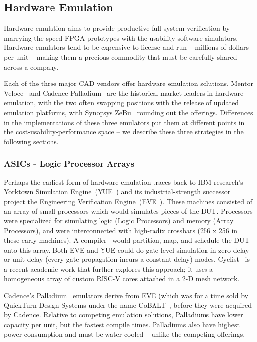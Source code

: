 \subsection{Hardware Emulation}

Hardware emulation aims to provide productive full-system verification by
marrying the speed FPGA prototypes with the usability software simulators.
Hardware emulators tend to be expensive to license and run -- millions of
dollars per unit -- making them a precious commodity that must be carefully
shared across a company.

Each of the three major CAD vendors offer hardware emulation solutions.
Mentor Veloce~\cite{Veloce} and Cadence Palladium~\cite{Palladium} are the historical market leaders in
hardware emulation, with the two often swapping positions with the release of updated
emulation platforms, with Synopsys ZeBu~\cite{ZeBu} rounding out the offerings.
Differences in the implementations of these three emulators put them at
different points in the cost-usability-performance space -- we describe these three strategies in the following sections.

\subsubsection{ASICs - Logic Processor Arrays}

Perhaps the earliest form of hardware emulation traces back to IBM research's
Yorktown Simulation Engine~(YUE~\cite{YSEHardware}) and its industrial-strength successor project
the Engineering Verification Engine~(EVE~\cite{EngineeringVerificationEngine}). These machines consisted of an array
of small processors which would simulates pieces of the DUT. Processors were
specialized for simulating logic (Logic Processors) and memory (Array
Processors), and were interconnected with high-radix crossbars (256 x 256 in
these early machines). A compiler~\cite{YSESoftware} would partition, map, and schedule
the DUT onto this array. Both EVE and YUE could do gate-level simulation in zero-delay
or unit-delay (every gate propagation incurs a constant delay) modes. Cyclist~\cite{Cyclist}
is a recent academic work that further explores this approach; it uses a
homogeneous array of custom RISC-V cores attached in a 2-D mesh network.

Cadence's Palladium~\cite{Palladium} emulators derive from EVE (which was for a time sold by QuickTurn Design Systems under the name CoBALT~\cite{CoBALT}, before they
were acquired by Cadence. Relative to
competing emulation solutions, Palladiums have lower capacity per unit, but the
fastest compile times. Palladiums also have highest power consumption and must be
water-cooled -- unlike the competing offerings.


